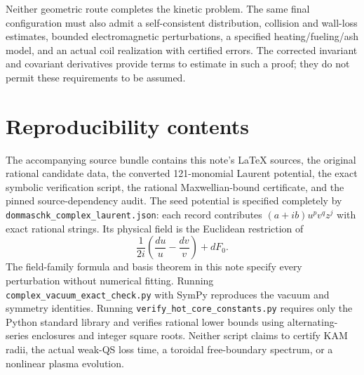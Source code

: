 \documentclass[11pt]{article}
\begin{document}
Neither geometric route completes the kinetic problem. The same final configuration must also admit a self-consistent distribution, collision and wall-loss estimates, bounded electromagnetic perturbations, a specified heating/fueling/ash model, and an actual coil realization with certified errors. The corrected invariant and covariant derivatives provide terms to estimate in such a proof; they do not permit these requirements to be assumed.

\section{Reproducibility contents}

The accompanying source bundle contains this note's LaTeX sources, the original rational candidate data, the converted 121-monomial Laurent potential, the exact symbolic verification script, the rational Maxwellian-bound certificate, and the pinned source-dependency audit. The seed potential is specified completely by \texttt{dommaschk\_complex\_laurent.json}: each record contributes $(a+ib)u^p v^q z^j$ with exact rational strings. Its physical field is the Euclidean restriction of
\[
\frac{1}{2i}\left(\frac{du}{u}-\frac{dv}{v}\right)+dF_0.
\]
The field-family formula and basis theorem in this note specify every perturbation without numerical fitting. Running \texttt{complex\_vacuum\_exact\_check.py} with SymPy reproduces the vacuum and symmetry identities. Running \texttt{verify\_hot\_core\_constants.py} requires only the Python standard library and verifies rational lower bounds using alternating-series enclosures and integer square roots. Neither script claims to certify KAM radii, the actual weak-QS loss time, a toroidal free-boundary spectrum, or a nonlinear plasma evolution.
\end{document}

